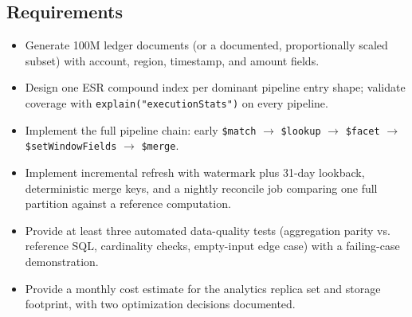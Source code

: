 \subsection*{Requirements}
\begin{itemize}
    \item Generate 100M ledger documents (or a documented, proportionally scaled subset) with account, region, timestamp, and amount fields.
    \item Design one ESR compound index per dominant pipeline entry shape; validate coverage with \texttt{explain("executionStats")} on every pipeline.
    \item Implement the full pipeline chain: early \texttt{\$match} $\to$ \texttt{\$lookup} $\to$ \texttt{\$facet} $\to$ \texttt{\$setWindowFields} $\to$ \texttt{\$merge}.
    \item Implement incremental refresh with watermark plus 31-day lookback, deterministic merge keys, and a nightly reconcile job comparing one full partition against a reference computation.
    \item Provide at least three automated data-quality tests (aggregation parity vs. reference SQL, cardinality checks, empty-input edge case) with a failing-case demonstration.
    \item Provide a monthly cost estimate for the analytics replica set and storage footprint, with two optimization decisions documented.
\end{itemize}

